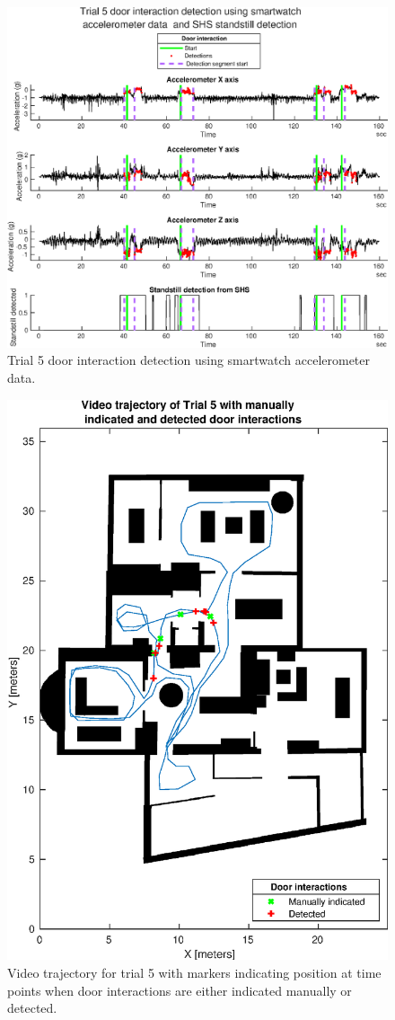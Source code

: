 \begin{figure}[H]
	\centering
	\includegraphics[width=0.8\linewidth]{images/20201201_1506_Trial_5_door_interaction_detection_using_smartwatch_1}
	\setlength{\belowcaptionskip}{-20pt}
	\caption{Trial 5 door interaction detection using smartwatch accelerometer data.}
	\label{fig:202011292141trial5doorinteractiondetectionusingsmartwatch1}
\end{figure}
\begin{figure}[H]
	\centering
	\includegraphics[width=0.7\linewidth]{images/20201129_2331_video_traj_Trial_5_door_detect_vs_manual_1}
	\setlength{\belowcaptionskip}{-20pt}
	\caption{Video trajectory for trial 5 with markers indicating position at time points when door interactions are either indicated manually or detected.}
	\label{fig:202011292331videotrajtrial5doordetectvsmanual1}
\end{figure}




